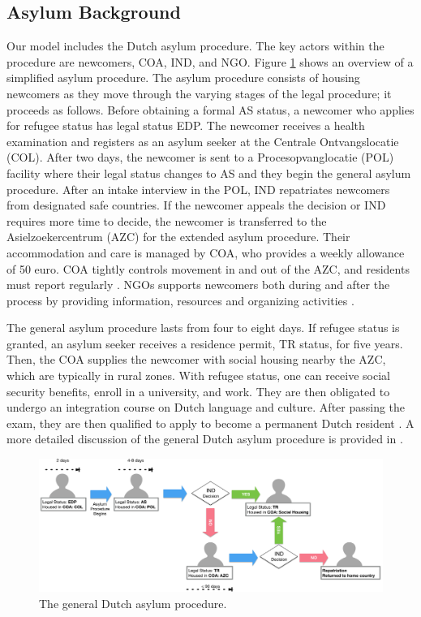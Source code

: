 \documentclass{scspaperproc}
\theoremstyle{scsthe}
\begin{document}
\subsection{Asylum Background}
Our model includes the Dutch asylum procedure. The key actors within the procedure are newcomers, COA, IND, and NGO. Figure \ref{fig:asy-proc} shows an overview of a simplified asylum procedure. The asylum procedure consists of housing newcomers as they move through the varying stages of the legal procedure; it proceeds as follows. Before obtaining a formal AS status, a newcomer who applies for refugee status has legal status EDP. The newcomer receives a health examination and registers as an asylum seeker at the Centrale Ontvangslocatie (COL). After two days, the newcomer is sent to a Procesopvanglocatie (POL) facility where their legal status changes to AS and they begin the general asylum procedure. After an intake interview in the POL, IND repatriates newcomers from designated safe countries. If the newcomer appeals the decision or IND requires more time to decide, the newcomer is transferred to the Asielzoekercentrum (AZC) for the extended asylum procedure. Their accommodation and care is managed by COA, who provides a weekly allowance of 50 euro. COA tightly controls movement in and out of the AZC, and residents must report regularly \cite{9}. NGOs supports newcomers both during and after the process by providing information, resources and organizing activities \cite{94}.

The general asylum procedure lasts from four to eight days. If refugee status is granted, an asylum seeker receives a residence permit, TR status, for five years. Then, the COA supplies the newcomer with social housing nearby the AZC, which are typically in rural zones. With refugee status, one can receive social security benefits, enroll in a university, and work. They are then obligated to undergo an integration course on Dutch language and culture. After passing the exam, they are then qualified to apply to become a permanent Dutch resident \cite{9}. A more detailed discussion of the general Dutch asylum procedure is provided in \cite{phil.masters.thesis}.

\begin{figure}[htb]
{
\centering
\includegraphics[width=0.85\columnwidth]{Asylum-Procedure.png}
\caption{The general Dutch asylum procedure.}
\label{fig:asy-proc}
}
\end{figure}
\end{document}
